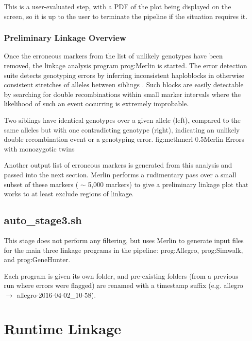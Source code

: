 This is a user-evaluated step, with a PDF of the plot being displayed on the screen, so it is up to the user to terminate the pipeline if the situation requires it.


\subsubsection{Preliminary Linkage Overview}

Once the erroneous markers from the list of unlikely genotypes have been removed, the linkage analysis program \gls{prog:Merlin} is started. The error detection suite detects genotyping errors by inferring inconsistent haploblocks in otherwise consistent stretches of alleles between siblings \cite{merlin}. Such blocks are easily detectable by searching for double recombinations within small marker intervals where the likelihood of such an event occurring is extremely improbable.

\vspace{10pt}
{Two siblings have identical genotypes over a given allele (left), compared to the same alleles but with one contradicting genotype (right), indicating an unlikely double recombination event or a genotyping error.}
{fig:methmerl}
{0.5}{Merlin Errors with monozygotic twins}

Another output list of erroneous markers is generated from this analysis and passed into the next section. Merlin performs a rudimentary pass over a small subset of these markers ( $\sim$ 5,000 markers) to give a preliminary linkage plot that works to at least exclude regions of linkage.

\subsection{auto\_stage3.sh}

This stage does not perform any filtering, but uses Merlin to generate input files for the main three linkage programs in the pipeline: \gls{prog:Allegro}, \gls{prog:Simwalk}, and \gls{prog:GeneHunter}.

Each program is given its own folder, and pre-existing folders (from a previous run where errors were flagged) are renamed with a timestamp suffix (e.g. allegro \(\rightarrow\) allegro-2016-04-02\_10-58).


\section{Runtime Linkage}

